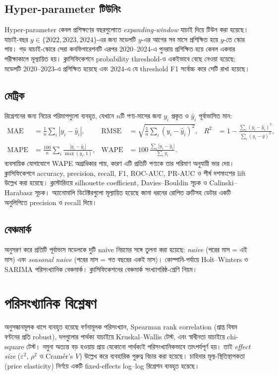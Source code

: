 \subsection{Hyper-parameter টিউনিং}
Hyper-parameter কেবল প্রশিক্ষণের বছরগুলোতে \emph{expanding-window} যাচাই দিয়ে টিউন করা হয়েছে। যাচাই-বছর
$y \in \{2022, 2023, 2024\}$-এর জন্য মডেলটি $y$-এর আগের সব মাসে প্রশিক্ষিত হয়ে $y$-তে স্কোর পায়। গড় যাচাই-স্কোরে সেরা
কনফিগারেশনটি এরপর 2020--2024-এ পুনরায় প্রশিক্ষিত হয়ে কেবল একবার পরীক্ষাকালে মূল্যায়িত হয়। ক্লাসিফিকেশনে probability
threshold-ও একইভাবে বেছে নেওয়া হয়েছে: মডেলটি 2020--2023-এ প্রশিক্ষিত হয়েছে এবং 2024-এ যে threshold F1 সর্বোচ্চ করে সেটি
রাখা হয়েছে।

\subsection{মেট্রিক}
রিগ্রেশনের জন্য নিচের পরিমাপগুলো ব্যবহৃত, যেখানে $n$টি পণ্য-মাসের জন্য $y_i$ প্রকৃত ও $\hat y_i$ পূর্বাভাসিত মান:
\begin{align*}
\text{MAE} &= \tfrac{1}{n}\textstyle\sum_i |y_i-\hat y_i|, &
\text{RMSE} &= \sqrt{\tfrac{1}{n}\textstyle\sum_i (y_i-\hat y_i)^2}, &
R^2 &= 1-\frac{\sum_i (y_i-\hat y_i)^2}{\sum_i (y_i-\bar y)^2},\\
\text{MAPE} &= \tfrac{100}{n}\textstyle\sum_i \frac{|y_i-\hat y_i|}{\max(y_i,1)}, &
\text{WAPE} &= 100\,\frac{\sum_i |y_i-\hat y_i|}{\sum_i y_i}. &&
\end{align*}
ব্যবসায়িক যোগাযোগে WAPE অগ্রাধিকার পায়, কারণ এটি প্রতিটি পণ্যকে তার পরিমাণ অনুযায়ী ভার দেয়। ক্লাসিফিকেশনে accuracy,
precision, recall, F1, ROC-AUC, PR-AUC ও শীর্ষ দশমাংশের lift উল্লেখ করা হয়েছে। ক্লাস্টারিংয়ে silhouette coefficient,
Davies--Bouldin সূচক ও Calinski--Harabasz সূচক। অ্যানোমালি ডিটেক্টরগুলো মূল্যায়িত হয়েছে জানা ধরনের রোপিত ত্রুটিসহ ডেটার একটি
অনুলিপিতে precision ও recall দিয়ে।

\subsection{বেঞ্চমার্ক}
\citet{makridakis2018} অনুসরণ করে প্রতিটি পূর্বাভাস মডেলকে দুটি naive নিয়মের সঙ্গে তুলনা করা হয়েছে: \emph{naive} (পরের মাস = এই
মাস) এবং \emph{seasonal naive} (পরের মাস = গত বছরের একই মাস)। কোম্পানি-পর্যায়ে Holt--Winters ও SARIMA পরিসংখ্যানিক বেঞ্চমার্ক।
ক্লাসিফিকেশনের বেঞ্চমার্ক সংখ্যাগরিষ্ঠ-শ্রেণি নিয়ম।

\section{পরিসংখ্যানিক বিশ্লেষণ}
অনুসন্ধানমূলক ধাপে ব্যবহৃত হয়েছে বর্ণনামূলক পরিসংখ্যান, Spearman rank correlation (প্রাপ্ত বিষম বণ্টনের প্রতি robust),
দলগুলোর পার্থক্য যাচাইয়ে Kruskal--Wallis টেস্ট, এবং স্বাধীনতা যাচাইয়ে chi-square টেস্ট। নমুনা অত্যন্ত বড় হওয়ায় প্রায় যেকোনো
পার্থক্যই পরিসংখ্যানিকভাবে তাৎপর্যপূর্ণ হয়। তাই \emph{effect size} ($\varepsilon^2$, $\rho^2$ ও Cram\'er's $V$) উল্লেখ করে
ব্যবহারিক গুরুত্ব বিচার করা হয়েছে। চাহিদার মূল্য-স্থিতিস্থাপকতা (price elasticity) নির্ণয়ে একটি fixed-effects log--log রিগ্রেশন
ব্যবহৃত হয়েছে।

